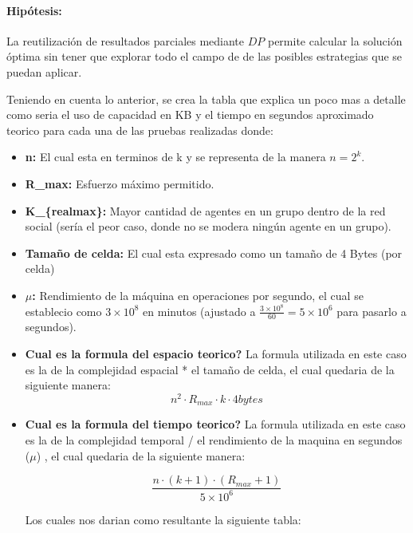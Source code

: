 \documentclass[11pt,letter]{article}
\begin{document}
\begin{itemize}
    \paragraph{Hipótesis:}

    La reutilización de resultados parciales mediante $DP$ permite calcular la solución óptima sin tener que explorar todo el campo de de las posibles estrategias que se puedan aplicar.

    Teniendo en cuenta lo anterior, se crea la tabla que explica un poco mas a detalle como seria el uso de capacidad en KB y el tiempo en segundos aproximado teorico para cada una de las pruebas realizadas donde:

\begin{itemize}

  \item \textbf{n:}
  El cual esta en terminos de k y se representa de la manera $n=2^k$.

  \item \textbf{R\_max:}
  Esfuerzo máximo permitido.

  \item \textbf{K\_\{realmax\}:}
  Mayor cantidad de agentes en un grupo dentro de la red social (sería el peor caso, donde no se modera ningún agente en un grupo).

  \item \textbf{Tamaño de celda:}
  El cual esta expresado como un tamaño de 4 Bytes (por celda)

  \item \textbf{$\mu$:}
  Rendimiento de la máquina en operaciones por segundo, el cual se establecio como $3 \times 10^8$ en minutos  (ajustado a $\frac{3 \times 10^{8}}{60} = 5 \times 10^{6}$ para pasarlo a segundos).

    \item \textbf{Cual es la formula del espacio teorico?}
La formula utilizada en este caso es la de la complejidad espacial * el tamaño de celda, el cual quedaria de la siguiente manera:
    \[
        n^2 \cdot R_{max} \cdot k \cdot 4 bytes
    \]

    \item \textbf{Cual es la formula del tiempo teorico?}
La formula utilizada en este caso es la de la complejidad temporal / el rendimiento de la maquina en segundos ($\mu$) , el cual quedaria de la siguiente manera:

\[
\frac{n \cdot (k+1) \cdot (R_{max}+1)}{5 \times 10^{6}}
\]


Los cuales nos darian como resultante la siguiente tabla:
\end{itemize}



\end{itemize}
\end{document}
